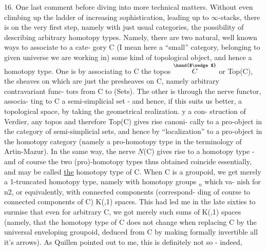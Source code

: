 

 16. One last comment before diving into more technical matters. Without
even climbing up the ladder of increasing sophistication, leading up
to $\infty$-stacks, there is on the very first step, namely with just usual
categories, the possibility of describing arbitrary homotopy types.
Namely, there are two natural, well known ways to associate to a cate-%
gory C (I mean here a ``small'' category, belonging to  given universe
we are working in) some kind of topological object, and hence a homotopy
type. One is by associating to C the topos $\overset{\hand{$\wedge$}}{C}$ or Top(C), the sheaves on
which are just the presheaves on C, namely arbitrary contravariant func-%
tors from C to (Sets). The other is through the nerve functor, associa-%
ting to C a semi-simplicial set - and hence, if this suits us better,
a topological space, by taking the geometrical realization. y a con-%
struction of Verdier, any topos and therefore Top(C) gives rise canoni-%
cally to a pro-object in the category of semi-simplicial sets, and hence
by ``localization'' to a pro-object in the homotopy category (namely a
pro-homotopy type in the terminology of Artin-Mazur). In the same way,
the nerve $\underline{N}$(C) gives rise to a homotopy type - and of course the two
(pro)-homotopy types thus obtained coincide essentially, and may be
called \uline{the} homotopy type of C. When C is a groupoid, we get merely
a 1-truncated homotopy type, namely with homotopy groups \hand{$\pi$}$_n$ which va-%
nish for n\hand{$\geqslant$}2, or equivalently, with connected components (correspond-%
ding of course to connected components of C) K(\hand{$\pi$},1) spaces. This had
led me  in the late sixties to  surmise that even for arbitrary C, we got
merely such sums of K(\hand{$\pi$},1) spaces (namely, that the homotopy type of C
does not change when replacing C by the universal enveloping groupoid,
deduced from C by  making formally invertible all it's arrows).
As Quillen pointed out to me, this is definitely not so - indeed,
